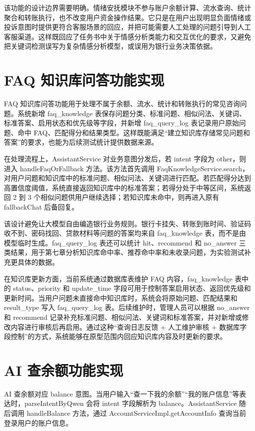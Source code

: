 \documentclass[bachelor, print]{xduthesis}
\begin{document}
该功能的设计边界需要明确。情绪安抚模块不参与账户余额计算、流水查询、统计聚合和转账执行，也不改变用户资金操作结果。它只是在用户出现明显负面情绪或投诉意图时提供更符合客服场景的回应，并把可能需要人工处理的问题引导到人工客服渠道。这样既回应了任务书中关于情感分析类能力和交互优化的要求，又避免把关键词检测误写为复杂情感分析模型，或误用为银行业务决策依据。

\section{FAQ 知识库问答功能实现}

FAQ 知识库问答功能用于处理不属于余额、流水、统计和转账执行的常见咨询问题。系统新增 faq\_knowledge 表保存问题分类、标准问题、相似问法、关键词、标准答案、启用状态和优先级等字段，并新增 faq\_query\_log 表记录用户原始问题、命中 FAQ、匹配得分和结果类型。这样既能满足“建立知识库存储常见问题和答案”的要求，也能为后续测试统计提供数据来源。

在处理流程上，AssistantService 对业务意图分发后，若 intent 字段为 other，则进入 handleFaqOrFallback 方法。该方法首先调用 FaqKnowledgeService.search，对用户问题和知识库中的标准问题、相似问法、关键词进行匹配。若匹配得分达到高置信度阈值，系统直接返回知识库中的标准答案；若得分处于中等区间，系统返回 2 到 3 个相似问题供用户继续选择；若知识库未命中，则再进入原有 fallbackChat 后备回复。

该设计避免让大模型自由编造银行业务规则。银行卡挂失、转账到账时间、验证码收不到、密码找回、贷款材料等问题的答案均来自 faq\_knowledge 表，而不是由模型临时生成。faq\_query\_log 表还可以统计 hit、recommend 和 no\_answer 三类结果，用于第七章分析知识库命中率、推荐命中率和未收录问题，为实验测试补充更具体的数据。

在知识库更新方面，当前系统通过数据库表维护 FAQ 内容，faq\_knowledge 表中的 status、priority 和 update\_time 字段可用于控制答案启用状态、返回优先级和更新时间。当用户问题未直接命中知识库时，系统会将原始问题、匹配结果和 result\_type 写入 faq\_query\_log 表。后续维护时，管理人员可以根据 no\_answer 和 recommend 记录补充标准问题、相似问法、关键词和标准答案，并对新增或修改内容进行审核后再启用。通过这种“查询日志反馈 + 人工维护审核 + 数据库字段控制”的方式，系统能够在原型范围内回应知识库内容及时更新的要求。

\section{AI 查余额功能实现}

AI 查余额对应 balance 意图。当用户输入“查一下我的余额”“我的账户信息”等表达时，parseIntentByQwen 会将 intent 字段解析为 balance。AssistantService 随后调用 handleBalance 方法，通过 AccountServiceImpl.getAccountInfo 查询当前登录用户的账户信息。
\end{document}
